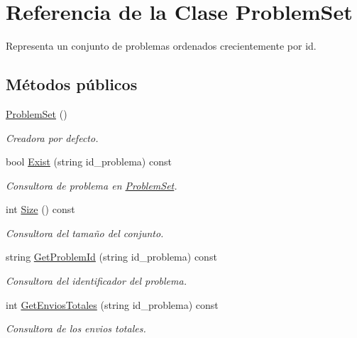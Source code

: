 \hypertarget{class_problem_set}{}\section{Referencia de la Clase Problem\+Set}
\label{class_problem_set}


Representa un conjunto de problemas ordenados crecientemente por id.  


\subsection*{Métodos públicos}
\begin{DoxyCompactItemize}
\item 
\mbox{\hyperlink{class_problem_set_a3eadb6c62386acf9948b95bb6d05b5ae}{Problem\+Set}} ()
\begin{DoxyCompactList}\small\item\em Creadora por defecto. \end{DoxyCompactList}\item 
bool \mbox{\hyperlink{class_problem_set_a51774196cd2b29bfc0e0adcca8dd325d}{Exist}} (string id\+\_\+problema) const
\begin{DoxyCompactList}\small\item\em Consultora de problema en \mbox{\hyperlink{class_problem_set}{Problem\+Set}}. \end{DoxyCompactList}\item 
int \mbox{\hyperlink{class_problem_set_ac173526274dc6d5f88623c3dd2630cd6}{Size}} () const
\begin{DoxyCompactList}\small\item\em Consultora del tamaño del conjunto. \end{DoxyCompactList}\item 
string \mbox{\hyperlink{class_problem_set_a8fd763c7dbee07a8f0101119f23e694a}{Get\+Problem\+Id}} (string id\+\_\+problema) const
\begin{DoxyCompactList}\small\item\em Consultora del identificador del problema. \end{DoxyCompactList}\item 
int \mbox{\hyperlink{class_problem_set_a33746a7a5aefdce5a4e8a5bf597c84f1}{Get\+Envios\+Totales}} (string id\+\_\+problema) const
\begin{DoxyCompactList}\small\item\em Consultora de los envios totales. \end{DoxyCompactList}\item 

\end{DoxyCompactItemize}
